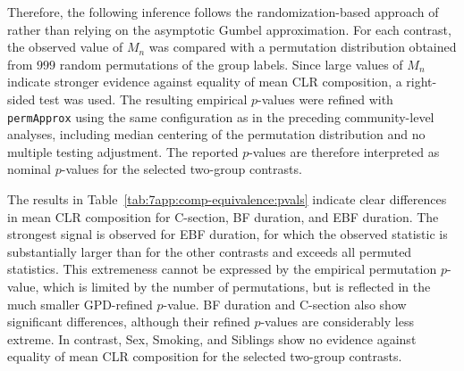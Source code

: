 Therefore, the following inference follows the randomization-based approach of \citet{sommer2022randomizationbased} rather than relying on the asymptotic Gumbel approximation. For each contrast, the observed value of $M_n$ was compared with a permutation distribution obtained from $999$ random permutations of the group labels. Since large values of $M_n$ indicate stronger evidence against equality of mean CLR composition, a right-sided test was used. The resulting empirical $p$-values were refined with \texttt{permApprox} using the same configuration as in the preceding community-level analyses, including median centering of the permutation distribution and no multiple testing adjustment. The reported $p$-values are therefore interpreted as nominal $p$-values for the selected two-group contrasts.

The results in Table~\ref{tab:7app:comp-equivalence:pvals} indicate clear differences in mean CLR composition for C-section, BF duration, and EBF duration. The strongest signal is observed for EBF duration, for which the observed statistic is substantially larger than for the other contrasts and exceeds all permuted statistics. This extremeness cannot be expressed by the empirical permutation $p$-value, which is limited by the number of permutations, but is reflected in the much smaller GPD-refined $p$-value. BF duration and C-section also show significant differences, although their refined $p$-values are considerably less extreme. In contrast, Sex, Smoking, and Siblings show no evidence against equality of mean CLR composition for the selected two-group contrasts.

